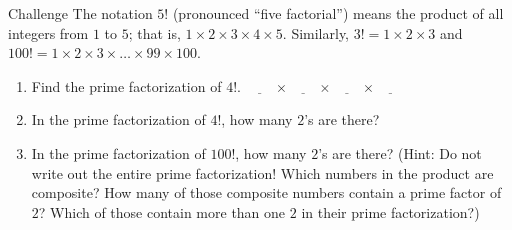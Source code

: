 \documentclass[12pt,letterpaper]{article}
\makeatletter
\newenvironment{problem}{\@startsection
       {section}
       {1}
       {-.2em}
       {-3.5ex plus -1ex minus -.2ex}
       {2.3ex plus .2ex}
       {\pagebreak[3]
       \large\bf\noindent{Problem }
       }
       }
\makeatother
\begin{document}
\begin{problem}{Challenge}
The notation $5!$ (pronounced ``five factorial'') means
the product of all integers from $1$ to $5$; that is,
$1 \times 2 \times 3 \times 4 \times 5$. Similarly,
$3! = 1 \times 2 \times 3$ and $100! = 1 \times 2 \times
3 \times\ldots\times 99 \times 100$.

\begin{enumerate}
 \item Find the prime factorization of $4!$. \hfill
 $\underline{\hspace{2em}} \times
  \underline{\hspace{2em}} \times \underline{\hspace{2em}}
  \times \underline{\hspace{2em}}$
 \item In the prime factorization of $4!$, how many $2$'s are there?
 \item In the prime factorization of $100!$, how many $2$'s are there?
 \small{(Hint: Do not write out the entire prime factorization! Which numbers in the product are composite? How many of
those composite numbers contain a prime factor of $2$? Which of those contain more than one $2$ in their prime
factorization?)} 
\end{enumerate}

\end{problem}
\end{document}
